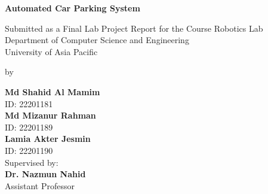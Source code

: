 \begin{titlepage}
    \begin{center}
        
        
        
        
        \LARGE
        \textbf{Automated Car Parking System}
         
        \par 
        \large
        
Submitted as a Final Lab Project Report for the Course Robotics Lab\\
Department of Computer Science and Engineering\\
University of Asia Pacific\\


        \vspace{1cm}
        
        by
        \Large
        \par
        \textbf{Md Shahid Al Mamim}\\ID: 22201181\\
        \vspace{0.2cm}
        \textbf{Md Mizanur Rahman}\\ID: 22201189\\
        \vspace{0.2cm}
        \textbf{Lamia Akter Jesmin}\\ID: 22201190\\
        
        \vspace{1.5cm}
        Supervised by:\\
        \Large
        \textbf{Dr. Nazmun Nahid}\\Assistant Professor\\
        \vspace{0.2cm}
        

         \vspace{1cm}
        

\end{center}
\end{titlepage}

